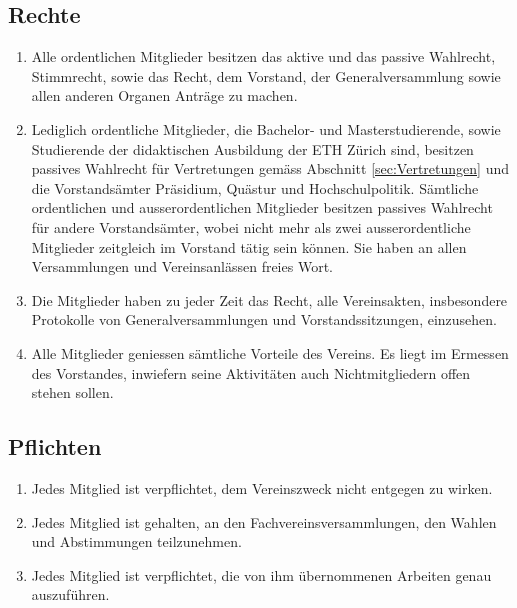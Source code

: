 \subsection{Rechte}
\begin{enumerate}
\item Alle ordentlichen Mitglieder besitzen das aktive und das passive Wahlrecht, Stimmrecht, sowie das Recht, dem Vorstand, der Generalversammlung sowie allen anderen Organen Anträge zu machen.
\item Lediglich ordentliche Mitglieder, die Bachelor- und Masterstudierende, sowie Studierende der didaktischen Ausbildung der ETH Zürich sind, besitzen passives Wahlrecht für Vertretungen gemäss Abschnitt \ref{sec:Vertretungen} und die Vorstandsämter Präsidium, Quästur und Hochschulpolitik. Sämtliche ordentlichen und ausserordentlichen Mitglieder besitzen passives Wahlrecht für andere Vorstandsämter, wobei nicht mehr als zwei ausserordentliche Mitglieder zeitgleich im Vorstand tätig sein können. Sie haben an allen Versammlungen und Vereinsanlässen freies Wort.
\item Die Mitglieder haben zu jeder Zeit das Recht, alle Vereinsakten, insbesondere Protokolle von Generalversammlungen und Vorstandssitzungen, einzusehen.
\item Alle Mitglieder geniessen sämtliche Vorteile des Vereins. Es liegt im Ermessen des Vorstandes, inwiefern seine Aktivitäten auch Nichtmitgliedern offen stehen sollen.
\end{enumerate}


\subsection{Pflichten}
\begin{enumerate}
\item Jedes Mitglied ist verpflichtet, dem Vereinszweck nicht entgegen zu wirken.
\item Jedes Mitglied ist gehalten, an den Fachvereinsversammlungen, den Wahlen und Abstimmungen
teilzunehmen.
\item Jedes Mitglied ist verpflichtet, die von ihm übernommenen Arbeiten genau auszuführen.
\end{enumerate}

